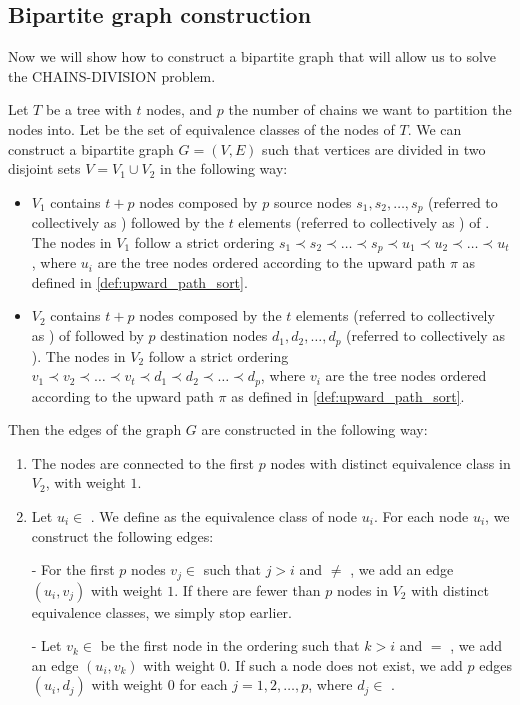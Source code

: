 \subsection{Bipartite graph construction}
Now we will show how to construct a bipartite graph that will allow us to solve the \textsc{CHAINS-DIVISION} problem.

\begin{definition} \label{def:bip_construction}
    Let $T$ be a tree with $t$ nodes, and $p$ the number of chains we want to partition the nodes into. Let \equivsetmath be the set of equivalence classes of the nodes of $T$. We can construct a bipartite graph $G = (V, E)$ such that vertices are divided in two disjoint sets $V = V_1 \cup V_2$ in the following way:
    \begin{itemize}
        \item $V_1$ contains $t + p$ nodes composed by $p$ source nodes $s_1, s_2, \dots, s_p$ (referred to collectively as \sourceset) followed by the $t$ elements (referred to collectively as ) of \equivsetmath. The nodes in $V_1$ follow a strict ordering $s_1 \prec s_2 \prec \dots \prec s_p \prec u_1 \prec u_2 \prec \dots \prec u_t$, where $u_i$ are the tree nodes ordered according to the upward path $\pi$ as defined in \cref{def:upward_path_sort}. 
        \item $V_2$ contains $t + p$ nodes composed by the $t$ elements (referred to collectively as ) of \equivsetmath followed by $p$ destination nodes $d_1, d_2, \dots, d_p$ (referred to collectively as \destset). The nodes in $V_2$ follow a strict ordering $v_1 \prec v_2 \prec \dots \prec v_t \prec d_1 \prec d_2 \prec \dots \prec d_p$, where $v_i$ are the tree nodes ordered according to the upward path $\pi$ as defined in \cref{def:upward_path_sort}.
    \end{itemize}

    Then the edges of the graph $G$ are constructed in the following way:
    \begin{enumerate}
        \item The \sourceset nodes are connected to the first $p$ nodes with distinct equivalence class in $V_2$, with weight $1$.
        \item Let $u_i \in$ . We define  as the equivalence class of node $u_i$. For each node $u_i$, we construct the following edges:
        
        - For the first $p$ nodes $v_j \in$  such that $j > i$ and  $\neq$ , we add an edge $(u_i, v_j)$ with weight $1$. If there are fewer than $p$ nodes in $V_2$ with distinct equivalence classes, we simply stop earlier.

        - Let $v_k \in$  be the first node in the ordering such that $k > i$ and  $=$ , we add an edge $(u_i, v_k)$ with weight $0$. If such a node does not exist, we add $p$ edges $(u_i, d_j)$ with weight $0$ for each $j = 1, 2, \ldots, p$, where $d_j \in$ \destset.
    \end{enumerate}
\end{definition}

